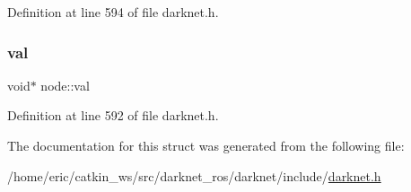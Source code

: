 Definition at line 594 of file darknet.\+h.

\mbox{\label{structnode_a3866f55c05d50265b730d8cdeec0a1f8}} 
\subsubsection{\texorpdfstring{val}{val}}
{\footnotesize\ttfamily void$\ast$ node\+::val}



Definition at line 592 of file darknet.\+h.



The documentation for this struct was generated from the following file\+:\begin{DoxyCompactItemize}
\item 
/home/eric/catkin\+\_\+ws/src/darknet\+\_\+ros/darknet/include/\mbox{\hyperlink{darknet_8h}{darknet.\+h}}\end{DoxyCompactItemize}
